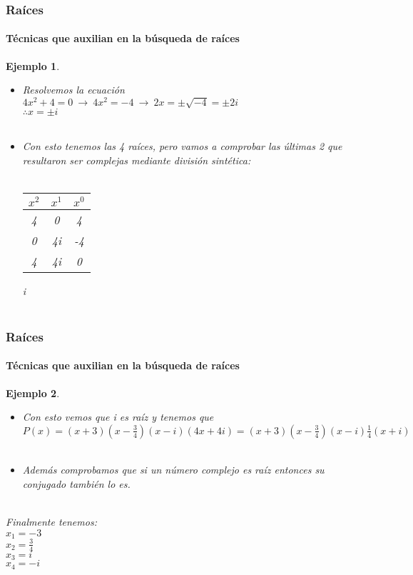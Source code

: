 \documentclass[11pt]{beamer}
\newtheorem{ejem}{Ejemplo}
\begin{document}
\begin{frame}
\frametitle{Raíces}
\framesubtitle{Técnicas que auxilian en la búsqueda de raíces}
\begin{ejem}
\begin{itemize}
\item Resolvemos la ecuación \\ 
$4x^2 + 4 = 0~\rightarrow ~ 4x^2 = -4~\rightarrow ~ 2x = \pm \sqrt{-4} = \pm 2i$\\
$\therefore x = \pm i$\\ \hspace{0cm} \\
\item Con esto tenemos las 4 raíces, pero vamos a comprobar las últimas 2 que resultaron ser complejas mediante división sintética:\\ \hspace{0cm} \\
\begin{tabular}{c|c|c|}
$x^2$ & $x^1$ & $x^0$\\ \hline
4 & 0 & 4\\ 
0 & 4i & -4\\ \hline
4 & 4i & 0
\end{tabular}
i\\ \hspace{0cm} \\
\end{itemize}
\end{ejem}
\end{frame}

\begin{frame}
\frametitle{Raíces}
\framesubtitle{Técnicas que auxilian en la búsqueda de raíces}
\begin{ejem}
\begin{itemize}
\item Con esto vemos que i es raíz y tenemos que $P(x) = (x+3)(x-\frac{3}{4})(x-i)(4x+4i) = (x+3)(x-\frac{3}{4})(x-i)\frac{1}{4}(x+i)$\\ \hspace{0cm} \\
\item Además comprobamos que si un número complejo es raíz entonces su conjugado también lo es.\\ \hspace{0cm} \\
\end{itemize}
Finalmente tenemos: \\
$x_1 = -3$\\
$x_2 = \frac{3}{4}$\\
$x_3 = i$\\
$x_4 = -i$\\
\end{ejem}
\end{frame}
\end{document}
